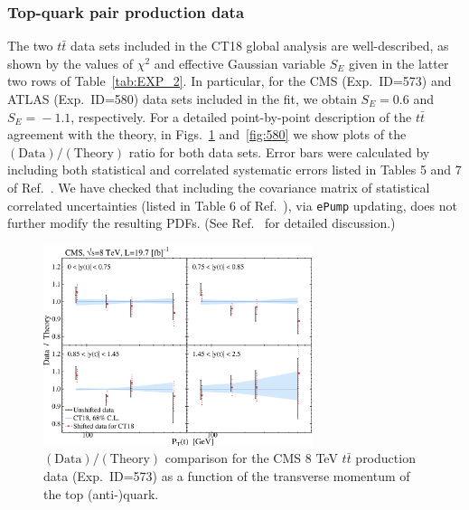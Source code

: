 \subsubsection{Top-quark pair production data
\label{sec:QualityTopData}
}


The two $t\bar{t}$ data sets included in the CT18 global analysis are well-described, as shown by the values of $\chi^2$ and effective Gaussian variable $S_E$ 
given in the latter two rows of Table~\ref{tab:EXP_2}. 
In particular, for the CMS (Exp.~ID=573) and ATLAS (Exp.~ID=580) data sets included in the fit,
we obtain $S_E\! =\! 0.6$ and $S_E\! =\! -1.1$, respectively.
For a detailed point-by-point description of the $t\bar{t}$ agreement with the theory,
in Figs.~\ref{fig:573} and~\ref{fig:580} we show plots of 
the $(\mathrm{Data})/(\mathrm{Theory})$ ratio
for both data sets.
%
Error bars were calculated by including both statistical and 
correlated systematic errors listed in Tables 5 and 7 of Ref.~\cite{Sirunyan:2017azo}. 
We have checked that including the covariance matrix of statistical 
correlated uncertainties (listed in Table 6 of Ref.~\cite{Sirunyan:2017azo}), via \texttt{ePump} updating, does not further modify the resulting PDFs. (See Ref.~\cite{Czakon:2019yrx} for detailed discussion.)
%

\begin{figure}[h]
	\includegraphics[width=0.7\textwidth]{./fig/data_573_CT18__com_DoT_ect.pdf}
	\caption{$(\mathrm{Data})/(\mathrm{Theory})$ comparison for the
	CMS 8 TeV $t\bar{t}$ production data (Exp.~ID=573) as a function of the transverse momentum of the top (anti-)quark.}
\label{fig:573}
\end{figure}

